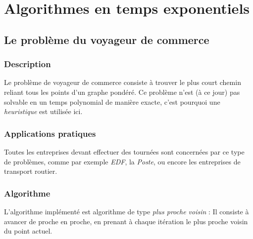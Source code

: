 \section{Algorithmes en temps exponentiels}
     \subsection{Le problème du voyageur de commerce}
        \subsubsection{Description}
                Le problème de voyageur de commerce consiste à trouver le plus
                court chemin reliant tous les points d'un graphe pondéré.
                Ce problème n'est (à ce jour) pas solvable en un temps
                polynomial de manière exacte, c'est pourquoi une \emph{heuristique}
                est utilisée ici.
        \subsubsection{Applications pratiques}
            Toutes les entreprises devant effectuer des tournées sont concernées
            par ce type de problèmes, comme par exemple \emph{EDF},
            la \emph{Poste}, ou encore les entreprises de transport routier.
        \subsubsection{Algorithme}
            L'algorithme implémenté est algorithme de type \emph{plus proche voisin} :
            Il consiste à avancer
            de proche en proche, en prenant à chaque itération le plus
            proche voisin du point actuel.
